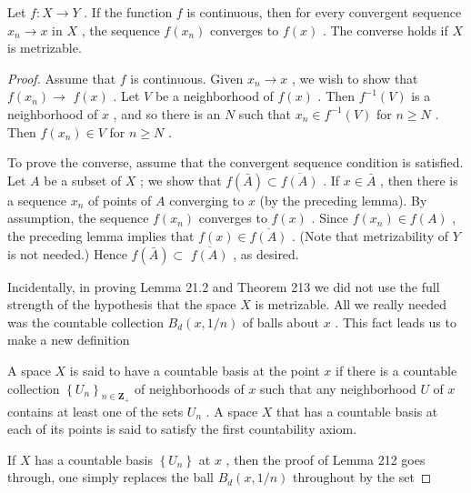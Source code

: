\begin{theorem} Let \(f : X \rightarrow  Y\) . If the function \(f\) is continuous, then for every convergent sequence \({x}_{n} \rightarrow  x\) in \(X\) , the sequence \(f\left( {x}_{n}\right)\) converges to \(f\left( x\right)\) . The converse holds if \(X\) is metrizable.

\end{theorem}
\begin{proof}
Assume that \(f\) is continuous. Given \({x}_{n} \rightarrow  x\) , we wish to show that \(f\left( {x}_{n}\right)  \rightarrow\)  \(f\left( x\right)\) . Let \(V\) be a neighborhood of \(f\left( x\right)\) . Then \({f}^{-1}\left( V\right)\) is a neighborhood of \(x\) , and so there is an \(N\) such that \({x}_{n} \in  {f}^{-1}\left( V\right)\) for \(n \geq  N\) . Then \(f\left( {x}_{n}\right)  \in  V\) for \(n \geq  N\) .

To prove the converse, assume that the convergent sequence condition is satisfied. Let \(A\) be a subset of \(X\) ; we show that \(f\left( \bar{A}\right)  \subset  \overline{f\left( A\right) }\) . If \(x \in  \bar{A}\) , then there is a sequence \({x}_{n}\) of points of \(A\) converging to \(x\) (by the preceding lemma). By assumption, the sequence \(f\left( {x}_{n}\right)\) converges to \(f\left( x\right)\) . Since \(f\left( {x}_{n}\right)  \in  f\left( A\right)\) , the preceding lemma implies that \(f\left( x\right)  \in  \overline{f\left( A\right) }\) . (Note that metrizability of \(Y\) is not needed.) Hence \(f\left( \bar{A}\right)  \subset\)  \(\overline{f\left( A\right) }\) , as desired.

Incidentally, in proving Lemma 21.2 and Theorem 213 we did not use the full strength of the hypothesis that the space \(X\) is metrizable. All we really needed was the countable collection \({B}_{d}\left( {x,1/n}\right)\) of balls about \(x\) . This fact leads us to make a new definition

A space \(X\) is said to have a countable basis at the point \(x\) if there is a countable collection \({\left\{  {U}_{n}\right\}  }_{n \in  {\mathbf{Z}}_{ + }}\) of neighborhoods of \(x\) such that any neighborhood \(U\) of \(x\) contains at least one of the sets \({U}_{n}\) . A space \(X\) that has a countable basis at each of its points is said to satisfy the first countability axiom.

If \(X\) has a countable basis \(\left\{  {U}_{n}\right\}\) at \(x\) , then the proof of Lemma 212 goes through, one simply replaces the ball \({B}_{d}\left( {x,1/n}\right)\) throughout by the set


\end{proof}
